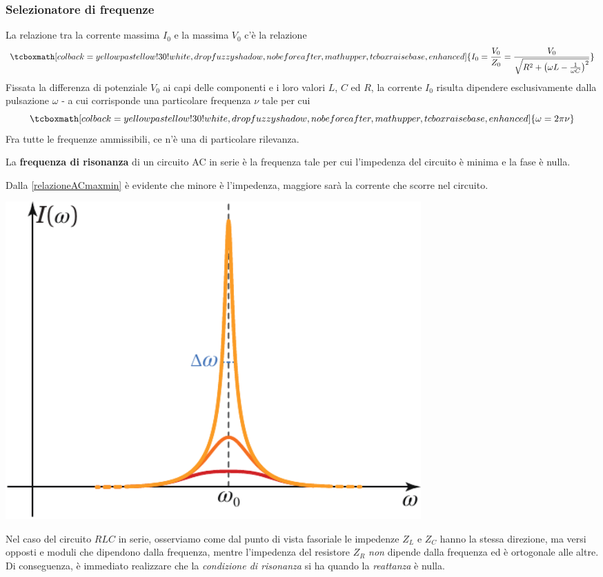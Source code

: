 \subsubsection{Selezionatore di frequenze}
La relazione tra la corrente massima $I_0$ e la \ddp massima $V_0$ c'è la relazione
\begin{equation}\label{relazioneACmaxmin}
	\tcboxmath[colback=yellowpastellow!30!white,drop fuzzy shadow, nobeforeafter, math upper, tcbox raise base, enhanced]{I_0=\frac{V_0}{Z_0}=\frac{V_0}{\sqrt{R^2+\left(\omega L -\frac{1}{\omega C}\right)^2}}}
\end{equation}
Fissata la differenza di potenziale $V_0$ ai capi delle componenti e i loro valori $L$, $C$ ed $R$, la corrente $I_0$ risulta dipendere esclusivamente dalla pulsazione $\omega$ - a cui corrisponde una particolare frequenza $\nu$ tale per cui
\begin{equation}
	\tcboxmath[colback=yellowpastellow!30!white,drop fuzzy shadow, nobeforeafter, math upper, tcbox raise base, enhanced]{\omega=2\pi \nu}
\end{equation}
Fra tutte le frequenze ammissibili, ce n'è una di particolare rilevanza.
\begin{define}
	La \textbf{frequenza di risonanza} di un circuito AC in serie è la frequenza tale per cui l'impedenza del circuito è minima e la fase è nulla.
\end{define}
Dalla \eqref{relazioneACmaxmin} è evidente che minore è l'impedenza, maggiore sarà la corrente che scorre nel circuito.
\begin{center}
	\includegraphics[width=0.7\textwidth]{images/chp11/chp11correnterisonanzagraf.pdf}
\end{center}
Nel caso del circuito $RLC$ in serie, osserviamo come dal punto di vista fasoriale le impedenze $Z_L$ e $Z_C$ hanno la stessa direzione, ma versi opposti e moduli che dipendono dalla frequenza, mentre l'impedenza del resistore $Z_R$ \textit{non} dipende dalla frequenza ed è ortogonale alle altre. Di conseguenza, è immediato realizzare che la \textit{condizione di risonanza} si ha quando la \textit{reattanza} è nulla.
